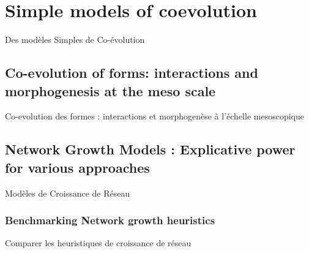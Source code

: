 

\chapter{Simple models of coevolution}{Des modèles Simples de Co-évolution}

\label{ch:coevolution} 















\newpage

\section[Co-evolution at the meso scale][Co-évolution à l'échelle mesoscopique]{Co-evolution of forms: interactions and morphogenesis at the meso scale}{Co-evolution des formes : interactions et morphogenèse à l'échelle mesoscopique}














\newpage

\section[Network Growth Models]{Network Growth Models : Explicative power for various approaches}{Modèles de Croissance de Réseau}

\subsection{Benchmarking Network growth heuristics}{Comparer les heuristiques de croissance de réseau}


